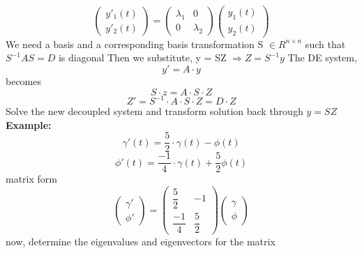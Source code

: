 \documentclass{article}
\begin{document}
\begin{equation*} \begin{pmatrix} y'_1(t) \\ y'_2(t) \end{pmatrix} = \begin{pmatrix} \lambda_1 & 0 \\ 0 & \lambda_2 \end{pmatrix} \begin{pmatrix} y_1(t) \\ y_2(t) \end{pmatrix}  \end{equation*}
We need a basis and a corresponding basis transformation S $\in R^{n \times n}$ such that $S^{-1}AS = D$ is diagonal \newline
Then we substitute, y = SZ $\Rightarrow Z = S^{-1}y$ \newline
The DE system, \begin{equation*} y' = A \cdot y \end{equation*} 
becomes \begin{equation*} S \cdot z = A \cdot S \cdot Z \end{equation*} 
\begin{equation*} Z' = S^{-1} \cdot A \cdot S \cdot Z = D \cdot Z \end{equation*}
Solve the new decoupled system and transform solution back through $y = SZ$ \newline
\textbf{Example:} 
\begin{equation*} \gamma'(t) = \frac{5}{2} \cdot \gamma(t) - \phi(t) \end{equation*}
\begin{equation*} \phi'(t) = \frac{-1}{4} \cdot \gamma(t) + \frac{5}{2} \phi(t) \end{equation*}
matrix form \begin{equation*} \begin{pmatrix} \gamma' \\[6pt] \phi' \end{pmatrix} = \begin{pmatrix} \dfrac{5}{2} & -1 \\[9pt] \dfrac{-1}{4} & \dfrac{5}{2} \end{pmatrix} \begin{pmatrix} \gamma \\[6pt] \phi \end{pmatrix}\end{equation*}
now, determine the eigenvalues and eigenvectors for the matrix\newline
\end{document}
